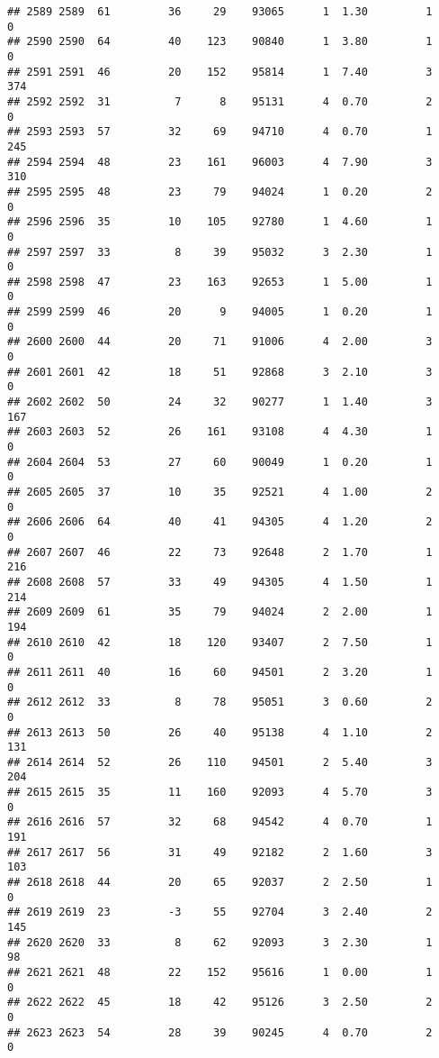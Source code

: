 \documentclass[
]{article}
\begin{document}
\begin{verbatim}
## 2589 2589  61         36     29    93065      1  1.30         1        0
## 2590 2590  64         40    123    90840      1  3.80         1        0
## 2591 2591  46         20    152    95814      1  7.40         3      374
## 2592 2592  31          7      8    95131      4  0.70         2        0
## 2593 2593  57         32     69    94710      4  0.70         1      245
## 2594 2594  48         23    161    96003      4  7.90         3      310
## 2595 2595  48         23     79    94024      1  0.20         2        0
## 2596 2596  35         10    105    92780      1  4.60         1        0
## 2597 2597  33          8     39    95032      3  2.30         1        0
## 2598 2598  47         23    163    92653      1  5.00         1        0
## 2599 2599  46         20      9    94005      1  0.20         1        0
## 2600 2600  44         20     71    91006      4  2.00         3        0
## 2601 2601  42         18     51    92868      3  2.10         3        0
## 2602 2602  50         24     32    90277      1  1.40         3      167
## 2603 2603  52         26    161    93108      4  4.30         1        0
## 2604 2604  53         27     60    90049      1  0.20         1        0
## 2605 2605  37         10     35    92521      4  1.00         2        0
## 2606 2606  64         40     41    94305      4  1.20         2        0
## 2607 2607  46         22     73    92648      2  1.70         1      216
## 2608 2608  57         33     49    94305      4  1.50         1      214
## 2609 2609  61         35     79    94024      2  2.00         1      194
## 2610 2610  42         18    120    93407      2  7.50         1        0
## 2611 2611  40         16     60    94501      2  3.20         1        0
## 2612 2612  33          8     78    95051      3  0.60         2        0
## 2613 2613  50         26     40    95138      4  1.10         2      131
## 2614 2614  52         26    110    94501      2  5.40         3      204
## 2615 2615  35         11    160    92093      4  5.70         3        0
## 2616 2616  57         32     68    94542      4  0.70         1      191
## 2617 2617  56         31     49    92182      2  1.60         3      103
## 2618 2618  44         20     65    92037      2  2.50         1        0
## 2619 2619  23         -3     55    92704      3  2.40         2      145
## 2620 2620  33          8     62    92093      3  2.30         1       98
## 2621 2621  48         22    152    95616      1  0.00         1        0
## 2622 2622  45         18     42    95126      3  2.50         2        0
## 2623 2623  54         28     39    90245      4  0.70         2        0

\end{verbatim}
\end{document}
